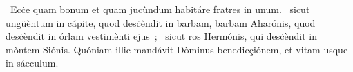 \psalmChapterWithInscription{}
{ }
{%
~Ecċe quam bonum et quam jucùndum habitáre fratres in unum. 
~sicut ungüèntum in cápite, quod desċèndit in barbam, barbam Aharónis, quod desċèndit in órlam vestimènti ejus~; 
~sicut ros Hermónis, qui desċèndit in mòntem Siónis. Quóniam illic mandávit Dòminus benedicçiónem, et vitam usque in sáeculum. 
}

